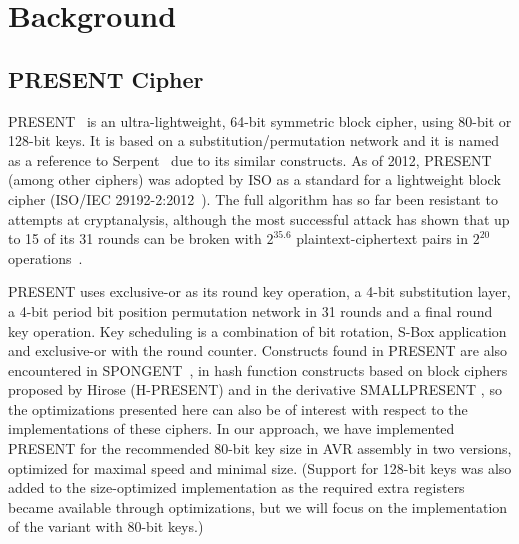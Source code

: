 \documentclass[11pt]{llncs2e} %
\begin{document}
\section{Background}
\subsection{PRESENT Cipher}
 PRESENT~\cite{bogdanov2007present} is an ultra-lightweight, 64-bit symmetric block cipher, using 80-bit or 128-bit keys.
It is based on a substitution/permutation network and it is named as a reference to Serpent~\cite{anderson1998serpent} due to its similar constructs.
As of 2012, PRESENT (among other ciphers) was adopted by ISO as a standard for a lightweight block cipher (ISO/IEC 29192-2:2012~\cite{present_iso}). The full algorithm has so far been resistant to attempts at cryptanalysis, although the most successful attack has shown that up to 15 of its 31 rounds can be broken with $2^{35.6}$ plaintext-ciphertext pairs in $2^{20}$ operations~\cite{abed2012biclique,collard2009statistical,nakahara2009linear}.

PRESENT uses exclusive-or as its round key operation, a 4-bit substitution layer, a 4-bit period bit position permutation network in 31 rounds and a final round key operation.
Key scheduling is a combination of bit rotation, S-Box application and exclusive-or with the round counter.
Constructs found in PRESENT are also encountered in SPONGENT~\cite{bogdanov2011spongent}, in hash function constructs based on block ciphers proposed by Hirose \cite{bogdanov2008hash,hirose2005provably,hirose2006some} (H-PRESENT) and in the derivative SMALLPRESENT \cite{leander2010small}, so the optimizations presented here can also be of interest with respect to the implementations of these ciphers. In our approach, we have implemented PRESENT for the recommended 80-bit key size in AVR assembly in two versions, optimized for maximal speed and minimal size.
(Support for 128-bit keys was also added to the size-optimized implementation as the required extra registers became available through optimizations, but we will focus on the implementation of the variant with 80-bit keys.)
\end{document}
